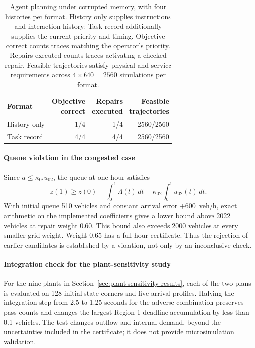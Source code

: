 \documentclass[final]{cas-sc}
\theoremstyle{definition}
\theoremstyle{plain}
\theoremstyle{definition}
\theoremstyle{plain}
\begin{document}
\begin{table}[pos=!htb]
\centering\small
\caption{Agent planning under corrupted memory, with four histories per
format. History only supplies instructions and interaction history; Task
record additionally supplies the current priority and timing. Objective
correct counts traces matching the operator's priority. Repairs executed
counts traces activating a checked repair. Feasible trajectories satisfy
physical and service requirements across $4\times640=2560$ simulations
per format.}
\label{tab:benchmark-api-execution}
\begin{tabularx}{\linewidth}{@{}Xrrr@{}}
\toprule
Format & \shortstack{Objective\\correct} & \shortstack{Repairs\\executed} & \shortstack{Feasible\\trajectories}\\
\midrule
History only & 1/4 & 1/4 & 2560/2560\\
Task record & 4/4 & 4/4 & 2560/2560\\
\bottomrule
\end{tabularx}
\end{table}

\paragraph{Queue violation in the congested case}
\label{app:congested-diagnostics}
Since $a\le\kappa_{02}u_{02}$, the queue at one hour satisfies
\[
z(1)\ge z(0)+\int_0^1\Lambda(t)\,dt
             -\kappa_{02}\int_0^1u_{02}(t)\,dt.
\]
With initial queue 510 vehicles and constant arrival error
$+600$~veh/h, exact arithmetic on the implemented coefficients gives
a lower bound above 2022 vehicles at repair weight 0.60. This bound also
exceeds 2000 vehicles at every smaller grid weight. Weight 0.65
has a full-hour certificate. Thus the rejection of earlier candidates
is established by a violation, not only by an inconclusive check.

\paragraph{Integration check for the plant-sensitivity study}
\label{app:plant-sensitivity}
For the nine plants in Section~\ref{sec:plant-sensitivity-results},
each of the two plans is evaluated on 128 initial-state corners and
five arrival profiles. Halving the integration step from 2.5 to
1.25 seconds for the adverse combination preserves pass counts and
changes the largest Region-1 deadline accumulation by less than
0.1 vehicles. The test changes outflow and internal demand, beyond
the uncertainties included in the certificate; it does not provide
microsimulation validation.
\end{document}

